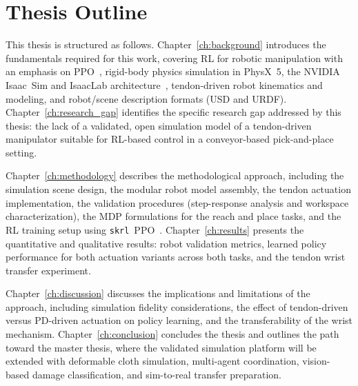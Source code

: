 \section{Thesis Outline}

This thesis is structured as follows.
Chapter~\ref{ch:background} introduces the fundamentals required for this work, covering \ac{RL} for robotic manipulation with an emphasis on \ac{PPO}~\cite{Schulman2017PPO}, rigid-body physics simulation in PhysX~5, the NVIDIA Isaac~Sim and IsaacLab architecture~\cite{Mittal2025IsaacLab}, tendon-driven robot kinematics and modeling, and robot/scene description formats (\ac{USD} and \ac{URDF}).
Chapter~\ref{ch:research_gap} identifies the specific research gap addressed by this thesis: the lack of a validated, open simulation model of a tendon-driven manipulator suitable for \ac{RL}-based control in a conveyor-based pick-and-place setting.

Chapter~\ref{ch:methodology} describes the methodological approach, including the simulation scene design, the modular robot model assembly, the tendon actuation implementation, the validation procedures (step-response analysis and workspace characterization), the \ac{MDP} formulations for the reach and place tasks, and the \ac{RL} training setup using \texttt{skrl}~\ac{PPO}~\cite{SerranoMunoz2023skrl,Schulman2017PPO}.
Chapter~\ref{ch:results} presents the quantitative and qualitative results: robot validation metrics, learned policy performance for both actuation variants across both tasks, and the tendon wrist transfer experiment.

Chapter~\ref{ch:discussion} discusses the implications and limitations of the approach, including simulation fidelity considerations, the effect of tendon-driven versus \ac{PD}-driven actuation on policy learning, and the transferability of the wrist mechanism.
Chapter~\ref{ch:conclusion} concludes the thesis and outlines the path toward the master thesis, where the validated simulation platform will be extended with deformable cloth simulation, multi-agent coordination, vision-based damage classification, and sim-to-real transfer preparation.
